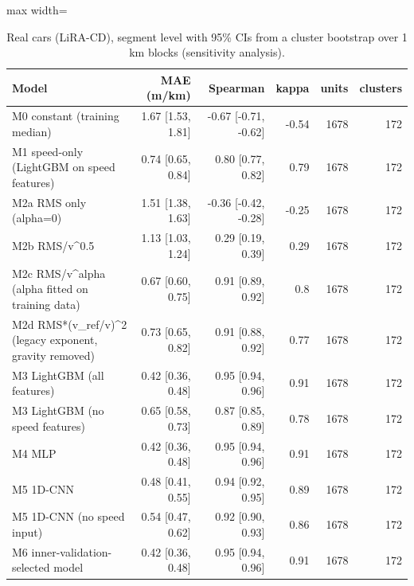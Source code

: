 \begin{table}[!htbp]
\centering
\footnotesize
\caption{Real cars (LiRA-CD), segment level with 95\% CIs from a cluster bootstrap over 1 km blocks (sensitivity analysis).}
\label{tab:tableS_block_bootstrap}
\begin{adjustbox}{max width=\columnwidth}
\begin{tabular}{lrrrrr}
\toprule
\textbf{Model} & \textbf{MAE (m/km)} & \textbf{Spearman} & \textbf{kappa} & \textbf{units} & \textbf{clusters} \\
\midrule
M0 constant (training median) & 1.67 [1.53, 1.81] & -0.67 [-0.71, -0.62] & -0.54 & 1678 & 172 \\
M1 speed-only (LightGBM on speed features) & 0.74 [0.65, 0.84] & 0.80 [0.77, 0.82] & 0.79 & 1678 & 172 \\
M2a RMS only (alpha=0) & 1.51 [1.38, 1.63] & -0.36 [-0.42, -0.28] & -0.25 & 1678 & 172 \\
M2b RMS/v\textasciicircum{}0.5 & 1.13 [1.03, 1.24] & 0.29 [0.19, 0.39] & 0.29 & 1678 & 172 \\
M2c RMS/v\textasciicircum{}alpha (alpha fitted on training data) & 0.67 [0.60, 0.75] & 0.91 [0.89, 0.92] & 0.8 & 1678 & 172 \\
M2d RMS*(v\_ref/v)\textasciicircum{}2 (legacy exponent, gravity removed) & 0.73 [0.65, 0.82] & 0.91 [0.88, 0.92] & 0.77 & 1678 & 172 \\
M3 LightGBM (all features) & 0.42 [0.36, 0.48] & 0.95 [0.94, 0.96] & 0.91 & 1678 & 172 \\
M3 LightGBM (no speed features) & 0.65 [0.58, 0.73] & 0.87 [0.85, 0.89] & 0.78 & 1678 & 172 \\
M4 MLP & 0.42 [0.36, 0.48] & 0.95 [0.94, 0.96] & 0.91 & 1678 & 172 \\
M5 1D-CNN & 0.48 [0.41, 0.55] & 0.94 [0.92, 0.95] & 0.89 & 1678 & 172 \\
M5 1D-CNN (no speed input) & 0.54 [0.47, 0.62] & 0.92 [0.90, 0.93] & 0.86 & 1678 & 172 \\
M6 inner-validation-selected model & 0.42 [0.36, 0.48] & 0.95 [0.94, 0.96] & 0.91 & 1678 & 172 \\
\bottomrule
\end{tabular}
\end{adjustbox}
\end{table}
